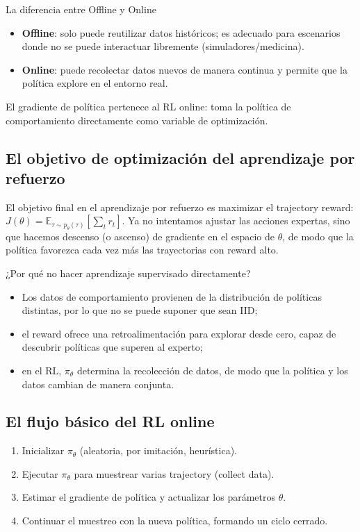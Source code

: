 \documentclass[a4paper]{article}
\begin{document}
\begin{knowledgebox}{La diferencia entre Offline y Online}
\begin{itemize}
    \item \textbf{Offline}: solo puede reutilizar datos históricos; es adecuado para escenarios donde no se puede interactuar libremente (simuladores/medicina).
    \item \textbf{Online}: puede recolectar datos nuevos de manera continua y permite que la política explore en el entorno real.
\end{itemize}
El gradiente de política pertenece al RL online: toma la política de comportamiento directamente como variable de optimización.
\end{knowledgebox}

\subsection{El objetivo de optimización del aprendizaje por refuerzo}

El objetivo final en el aprendizaje por refuerzo es maximizar el trajectory reward: $J(\theta) = \mathbb{E}_{\tau \sim p_\theta(\tau)} [\sum_t r_t]$. Ya no intentamos ajustar las acciones expertas, sino que hacemos descenso (o ascenso) de gradiente en el espacio de $\theta$, de modo que la política favorezca cada vez más las trayectorias con reward alto.

\begin{importantbox}{¿Por qué no hacer aprendizaje supervisado directamente?}
\begin{itemize}
    \item Los datos de comportamiento provienen de la distribución de políticas distintas, por lo que no se puede suponer que sean IID;
    \item el reward ofrece una retroalimentación para explorar desde cero, capaz de descubrir políticas que superen al experto;
    \item en el RL, $\pi_\theta$ determina la recolección de datos, de modo que la política y los datos cambian de manera conjunta.
\end{itemize}
\end{importantbox}

\subsection{El flujo básico del RL online}

\begin{enumerate}
    \item Inicializar $\pi_\theta$ (aleatoria, por imitación, heurística).
    \item Ejecutar $\pi_\theta$ para muestrear varias trajectory (collect data).
    \item Estimar el gradiente de política y actualizar los parámetros $\theta$.
    \item Continuar el muestreo con la nueva política, formando un ciclo cerrado.
\end{enumerate}
\end{document}
